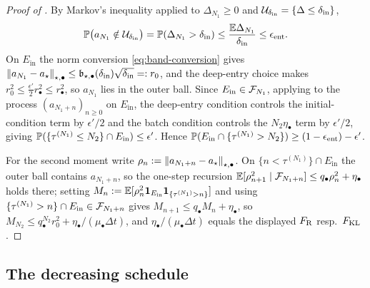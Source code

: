 \begin{proof}[Proof of ]
By Markov's inequality applied to $\Delta_{N_1}\geq0$ and $\mathcal{U}_{\delta_{\mathrm{in}}}=\{\Delta\leq\delta_{\mathrm{in}}\}$,
\[
    \mathbb{P}\bigl(a_{N_1}\notin\mathcal{U}_{\delta_{\mathrm{in}}}\bigr)=\mathbb{P}(\Delta_{N_1}>\delta_{\mathrm{in}})
    \leq\frac{\mathbb{E}\Delta_{N_1}}{\delta_{\mathrm{in}}}\leq\epsilon_{\mathrm{ent}} .
\]
On $E_{\mathrm{in}}$ the norm conversion \eqref{eq:band-conversion} gives
$\left\lVert a_{N_1}-a_\star\right\rVert_{\star,\bullet}\leq\mathfrak b_{\star,\bullet}(\delta_{\mathrm{in}})\sqrt{\delta_{\mathrm{in}}}=:r_0$,
and the deep-entry choice makes $r_0^2\leq\tfrac{\epsilon'}2r_\bullet^2\leq r_\bullet^2$, so $a_{N_1}$
lies in the outer ball. Since $E_{\mathrm{in}}\in\mathcal{F}_{N_1}$, applying  to the
process $(a_{N_1+n})_{n\geq0}$ on $E_{\mathrm{in}}$, the deep-entry condition controls the
initial-condition term by $\epsilon'/2$ and the batch condition controls the $N_2\eta_\bullet$ term by
$\epsilon'/2$, giving $\mathbb{P}(\{\tau^{(N_1)}\leq N_2\}\cap E_{\mathrm{in}})\leq\epsilon'$. Hence
$\mathbb{P}(E_{\mathrm{in}}\cap\{\tau^{(N_1)}>N_2\})\geq(1-\epsilon_{\mathrm{ent}})-\epsilon'$.

For the second moment write $\rho_n:=\left\lVert a_{N_1+n}-a_\star\right\rVert_{\star,\bullet}$. On
$\{n<\tau^{(N_1)}\}\cap E_{\mathrm{in}}$ the outer ball contains $a_{N_1+n}$, so the one-step recursion
$\mathbb{E}[\rho_{n+1}^2\mid\mathcal{F}_{N_1+n}]\leq q_\bullet\rho_n^2+\eta_\bullet$ holds there; setting
$M_n:=\mathbb{E}[\rho_n^2\mathbf1_{E_{\mathrm{in}}}\mathbf1_{\{\tau^{(N_1)}>n\}}]$ and using
$\{\tau^{(N_1)}>n\}\cap E_{\mathrm{in}}\in\mathcal{F}_{N_1+n}$ gives $M_{n+1}\leq q_\bullet M_n+\eta_\bullet$,
so $M_{N_2}\leq q_\bullet^{N_2}r_0^2+\eta_\bullet/(\mu_\bullet\Delta t)$, and
$\eta_\bullet/(\mu_\bullet\Delta t)$ equals the displayed $F_{\mathrm{R}}$ resp.\ $F_{\mathrm{KL}}$.
\end{proof}

\subsection{The decreasing schedule}

